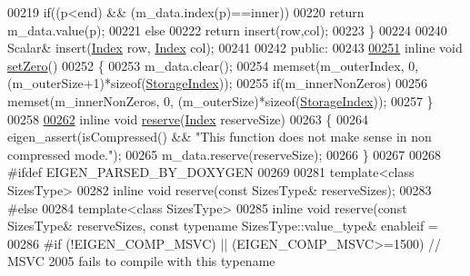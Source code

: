 \begin{DoxyCode}
00219       \textcolor{keywordflow}{if}((p<end) && (m\_data.index(p)==inner))
00220         \textcolor{keywordflow}{return} m\_data.value(p);
00221       \textcolor{keywordflow}{else}
00222         \textcolor{keywordflow}{return} insert(row,col);
00223     \}
00224 
00240     Scalar& insert(\hyperlink{group___core___module_a554f30542cc2316add4b1ea0a492ff02}{Index} row, \hyperlink{group___core___module_a554f30542cc2316add4b1ea0a492ff02}{Index} col);
00241 
00242   \textcolor{keyword}{public}:
00243 
\hyperlink{group___sparse_core___module_ad3c7416090f913e8685523cb3ab7c2f7}{00251}     \textcolor{keyword}{inline} \textcolor{keywordtype}{void} \hyperlink{group___sparse_core___module_ad3c7416090f913e8685523cb3ab7c2f7}{setZero}()
00252     \{
00253       m\_data.clear();
00254       memset(m\_outerIndex, 0, (m\_outerSize+1)*\textcolor{keyword}{sizeof}(\hyperlink{group___sparse_core___module_a0b540ba724726ebe953f8c0df06081ed}{StorageIndex}));
00255       \textcolor{keywordflow}{if}(m\_innerNonZeros)
00256         memset(m\_innerNonZeros, 0, (m\_outerSize)*\textcolor{keyword}{sizeof}(\hyperlink{group___sparse_core___module_a0b540ba724726ebe953f8c0df06081ed}{StorageIndex}));
00257     \}
00258 
\hyperlink{group___sparse_core___module_a1518e58ac49bed0e2385b722a034f7d3}{00262}     \textcolor{keyword}{inline} \textcolor{keywordtype}{void} \hyperlink{group___sparse_core___module_a1518e58ac49bed0e2385b722a034f7d3}{reserve}(\hyperlink{group___core___module_a554f30542cc2316add4b1ea0a492ff02}{Index} reserveSize)
00263     \{
00264       eigen\_assert(isCompressed() && \textcolor{stringliteral}{"This function does not make sense in non compressed mode."});
00265       m\_data.reserve(reserveSize);
00266     \}
00267     
00268 \textcolor{preprocessor}{    #ifdef EIGEN\_PARSED\_BY\_DOXYGEN}
00269 
00281     \textcolor{keyword}{template}<\textcolor{keyword}{class} SizesType>
00282     \textcolor{keyword}{inline} \textcolor{keywordtype}{void} reserve(\textcolor{keyword}{const} SizesType& reserveSizes);
00283 \textcolor{preprocessor}{    #else}
00284     \textcolor{keyword}{template}<\textcolor{keyword}{class} SizesType>
00285     \textcolor{keyword}{inline} \textcolor{keywordtype}{void} reserve(\textcolor{keyword}{const} SizesType& reserveSizes, \textcolor{keyword}{const} \textcolor{keyword}{typename} SizesType::value\_type& enableif =
00286     #\textcolor{keywordflow}{if} (!EIGEN\_COMP\_MSVC) || (EIGEN\_COMP\_MSVC>=1500) \textcolor{comment}{// MSVC 2005 fails to compile with this typename}

\end{DoxyCode}
